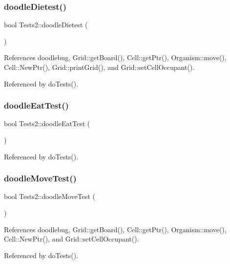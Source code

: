 \mbox{\label{classTests2_aaf403f9bb7338771173e2053ea4f95fc}} 
\subsubsection{doodle\+Dietest()}
{\footnotesize\ttfamily bool Tests2\+::doodle\+Dietest (\begin{DoxyParamCaption}{ }\end{DoxyParamCaption})}



References doodlebug, Grid\+::get\+Board(), Cell\+::get\+Ptr(), Organism\+::move(), Cell\+::\+New\+Ptr(), Grid\+::print\+Grid(), and Grid\+::set\+Cell\+Occupant().



Referenced by do\+Tests().

\mbox{\label{classTests2_ae35f30e7d95e581cc4ce1316409c71ac}} 
\subsubsection{doodle\+Eat\+Test()}
{\footnotesize\ttfamily bool Tests2\+::doodle\+Eat\+Test (\begin{DoxyParamCaption}{ }\end{DoxyParamCaption})}



Referenced by do\+Tests().

\mbox{\label{classTests2_a2143f2192836626e7214d37b504df381}} 
\subsubsection{doodle\+Move\+Test()}
{\footnotesize\ttfamily bool Tests2\+::doodle\+Move\+Test (\begin{DoxyParamCaption}{ }\end{DoxyParamCaption})}



References doodlebug, Grid\+::get\+Board(), Cell\+::get\+Ptr(), Organism\+::move(), Cell\+::\+New\+Ptr(), and Grid\+::set\+Cell\+Occupant().



Referenced by do\+Tests().

